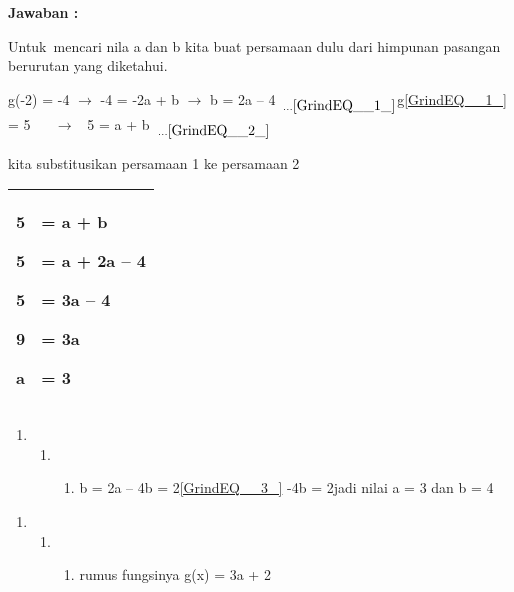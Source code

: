\documentclass[11pt,fleqn]{book} %
\begin{document}
\noindent 

\textbf{Jawaban :}

\textbf{}

\noindent Untuk~mencari nila a dan b kita buat persamaan dulu dari himpunan pasangan berurutan yang diketahui.

\noindent g(-2) = -4 $\mathrm{\to}$ -4 = -2a + b $\mathrm{\to}$ b = 2a -- 4~${}_{{\dots}\eqref{GrindEQ__1_}}$g\eqref{GrindEQ__1_} = 5 ~ ~$\mathrm{\to}$ ~5 = a + b~${}_{{\dots}\eqref{GrindEQ__2_}}$

\noindent kita substitusikan persamaan 1 ke persamaan 2

\noindent 

\begin{tabular}{|p{0.1in}|p{1.0in}|} \hline 
5 \par 5 \par 5 \par 9 \par a & = a + b \par = a + 2a -- 4 \par = 3a -- 4 \par = 3a \par = 3 \\ \hline 
\end{tabular}



\noindent 

\noindent 

\noindent 

\noindent 

\noindent 

\noindent 

\begin{enumerate}
\item \begin{enumerate}
\item \begin{enumerate}
\item  b = 2a -- 4b = 2\eqref{GrindEQ__3_} -4b = 2jadi nilai a = 3 dan b = 4
\end{enumerate}
\end{enumerate}
\end{enumerate}

\noindent 

\begin{enumerate}
\item \begin{enumerate}
\item \begin{enumerate}
\item  rumus fungsinya g(x) = 3a + 2
\end{enumerate}
\end{enumerate}
\end{enumerate}
\end{document}
